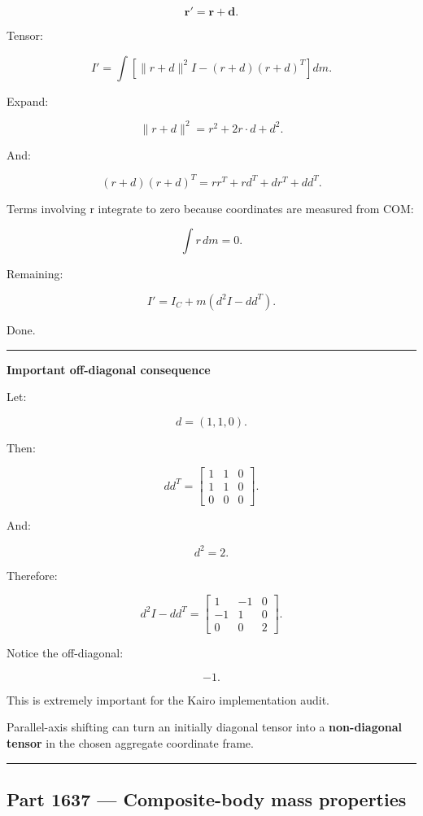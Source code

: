 \[
\mathbf{r}'
=
\mathbf{r}+\mathbf{d}.
\]

Tensor:

\[
I'
=
\int
[
\|r+d\|^2I
-
(r+d)(r+d)^T
]
dm.
\]

Expand:

\[
\|r+d\|^2
=
r^2+2r\cdot d+d^2.
\]

And:

\[
(r+d)(r+d)^T
=
rr^T+rd^T+dr^T+dd^T.
\]

Terms involving r integrate to zero because coordinates are measured from COM:

\[
\int r\,dm=0.
\]

Remaining:

\[
I'
=
I_C+
m(d^2I-dd^T).
\]

Done.

\begin{center}\rule{0.5\linewidth}{0.5pt}\end{center}

\textbf{Important off-diagonal consequence}

Let:

\[
d=(1,1,0).
\]

Then:

\[
dd^T
=
\begin{bmatrix}
1&1&0\\
1&1&0\\
0&0&0
\end{bmatrix}.
\]

And:

\[
d^2=2.
\]

Therefore:

\[
d^2I-dd^T
=
\begin{bmatrix}
1&-1&0\\
-1&1&0\\
0&0&2
\end{bmatrix}.
\]

Notice the off-diagonal:

\[
-1.
\]

This is extremely important for the Kairo implementation audit.

Parallel-axis shifting can turn an initially diagonal tensor into a \textbf{non-diagonal tensor} in the chosen aggregate coordinate frame.

\begin{center}\rule{0.5\linewidth}{0.5pt}\end{center}

\subsection{Part 1637 --- Composite-body mass properties}\label{06-engine-ii-ch035-part-1637-composite-body-mass-properties}

